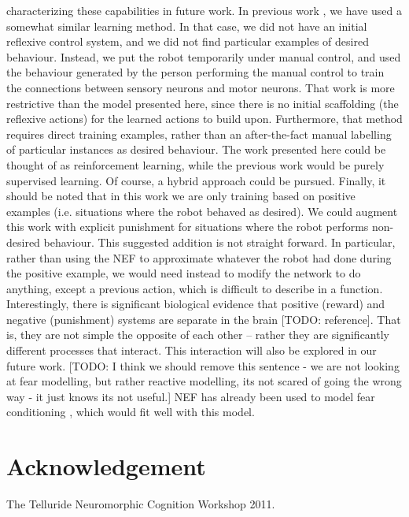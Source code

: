 \documentclass[conference]{IEEEtran}
\begin{document}
characterizing these capabilities in future work. In previous work \cite{conradt2014trainable}, we have used a somewhat similar learning method. In that case, we did not have an initial reflexive control system, and we did not find particular examples of desired behaviour. Instead, we put the robot
temporarily under manual control, and used the behaviour generated by the person performing the manual control to train the connections between sensory neurons and motor neurons. That work is more restrictive than the model
presented here, since there is no initial scaffolding (the reflexive actions) for the learned actions to build upon.
Furthermore, that method requires direct training examples, rather than an after-the-fact manual labelling of particular instances as desired behaviour. The work presented here could be thought of as reinforcement learning, while the previous work would be purely supervised learning. Of course, a hybrid approach could be pursued. Finally, it should be noted that in this work we are only training based on positive examples (i.e. situations where the robot behaved as desired). We could augment this work with explicit punishment for situations where the robot performs non-desired behaviour. This suggested addition is not straight forward. In particular, rather than using the NEF to approximate whatever the robot had done during the positive example,
we would need instead to modify the network to do anything, except a previous action, which is difficult to describe in a function. Interestingly, there
is significant biological evidence that positive (reward) and negative (punishment) systems are separate in the brain [TODO: reference]. That is, they are not simple the opposite of each other – rather they are significantly different processes that interact. This interaction will also be explored in our future work. [TODO: I think we should remove this sentence - we are not looking at fear modelling, but rather reactive modelling, its not scared of going the wrong way - it just knows its not useful.] NEF has already been used to model fear 
conditioning \cite{kolbeck2013fear}, which would fit well with this model.



\section*{Acknowledgement}

The Telluride Neuromorphic Cognition Workshop 2011. 




\end{document}
